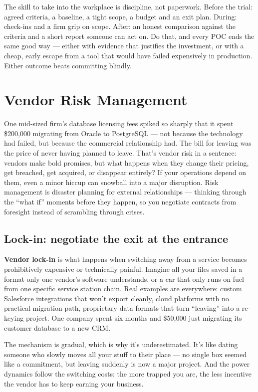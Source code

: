 The skill to take into the workplace is discipline, not paperwork. Before the trial: agreed criteria, a baseline, a tight scope, a budget and an exit plan. During: check-ins and a firm grip on scope. After: an honest comparison against the criteria and a short report someone can act on. Do that, and every POC ends the same good way — either with evidence that justifies the investment, or with a cheap, early escape from a tool that would have failed expensively in production. Either outcome beats committing blindly.

\section{Vendor Risk Management}
One mid-sized firm's database licensing fees spiked so sharply that it spent \$200,000 migrating from Oracle to PostgreSQL — not because the technology had failed, but because the commercial relationship had. The bill for leaving was the price of never having planned to leave. That's vendor risk in a sentence: vendors make bold promises, but what happens when they change their pricing, get breached, get acquired, or disappear entirely? If your operations depend on them, even a minor hiccup can snowball into a major disruption. Risk management is disaster planning for external relationships — thinking through the ``what if'' moments before they happen, so you negotiate contracts from foresight instead of scrambling through crises.



\subsection{Lock-in: negotiate the exit at the entrance}


\textbf{Vendor lock-in} is what happens when switching away from a service becomes prohibitively expensive or technically painful. Imagine all your files saved in a format only one vendor's software understands, or a car that only runs on fuel from one specific service station chain. Real examples are everywhere: custom Salesforce integrations that won't export cleanly, cloud platforms with no practical migration path, proprietary data formats that turn ``leaving'' into a re-keying project. One company spent six months and \$50,000 just migrating its customer database to a new CRM.


The mechanism is gradual, which is why it's underestimated. It's like dating someone who slowly moves all your stuff to their place — no single box seemed like a commitment, but leaving suddenly is now a major project. And the power dynamics follow the switching costs: the more trapped you are, the less incentive the vendor has to keep earning your business.


